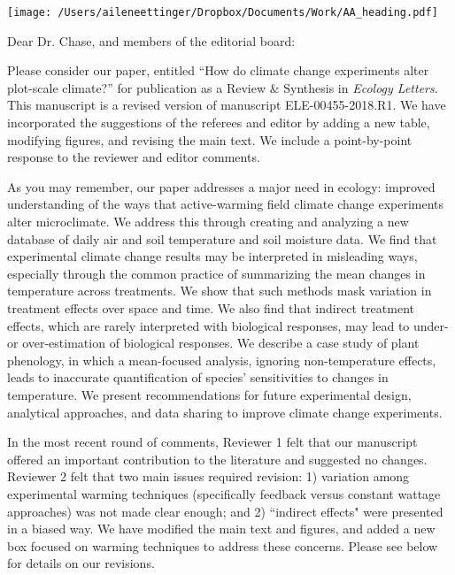 \documentclass[11pt,a4paper]{letter}
\begin{document}


\begin{letter}{}
\texttt{[image: /Users/aileneettinger/Dropbox/Documents/Work/AA\_heading.pdf]}

\opening{Dear Dr. Chase, and members of the editorial board:}
Please consider our paper, entitled ``How do climate change experiments alter plot-scale climate?'' for publication as a Review \& Synthesis in \emph{Ecology Letters}. This manuscript is a revised version of manuscript  ELE-00455-2018.R1. We have incorporated the suggestions of the referees and editor by adding a new table, modifying figures, and revising the main text. We include a point-by-point response to the reviewer and editor comments. 

As you may remember, our paper addresses a major need in ecology: improved understanding of the ways that active-warming field climate change experiments alter microclimate. We address this through creating and analyzing a new database of daily air and soil temperature and soil moisture data.  We find that experimental climate change results may be interpreted in misleading ways, especially through the common practice of summarizing the mean changes in temperature across treatments.  We show that such methods mask variation in treatment effects over space and time. We also find that indirect treatment effects, which are rarely interpreted with biological responses, may lead to under- or over-estimation of biological responses. We describe a case study of plant phenology, in which a mean-focused analysis, ignoring non-temperature effects, leads to inaccurate quantification of species' sensitivities to changes in temperature. We present recommendations for future experimental design, analytical approaches, and data sharing to improve climate change experiments.

In the most recent round of comments, Reviewer 1 felt that our manuscript offered an important contribution to the literature and suggested no changes. Reviewer 2 felt that two main issues required revision: 1) variation among experimental warming techniques (specifically feedback versus constant wattage approaches) was not made clear enough; and 2) ``indirect effects" were presented in a biased way.  We have modified the main text and figures, and added a new box focused on warming techniques to address these concerns. Please see below for details on our revisions.  %


\end{letter}
\end{document}
